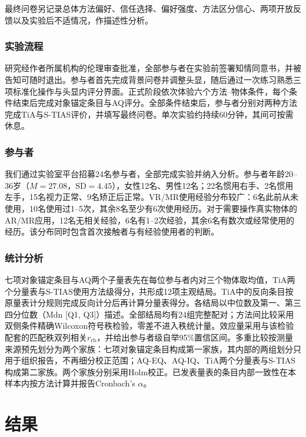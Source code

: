 \documentclass[review]{vgtc}
\begin{document}
最终问卷另记录总体方法偏好、信任选择、偏好强度、方法区分信心、两项开放反馈以及实验后不适情况，作描述性分析。

\subsubsection{实验流程}

研究经作者所属机构的伦理审查批准，全部参与者在实验前签署知情同意书，并被告知可随时退出。参与者首先完成背景问卷并调整头显，随后通过一次练习熟悉三项标准化操作与头显内评分界面。正式阶段依次体验六个方法--物体条件，每个条件结束后完成对象锚定条目与AQ评分。全部条件结束后，参与者分别对两种方法完成TiA与S-TIAS评价，并填写最终问卷。单次实验约持续60分钟，其间可按需休息。

\subsubsection{参与者}

我们通过实验室平台招募24名参与者，全部完成实验并纳入分析。参与者年龄20--36岁（$M=27.08$，$\mathrm{SD}=4.45$），女性12名、男性12名；22名惯用右手、2名惯用左手，15名视力正常、9名矫正后正常。VR/MR使用经验分布较广：6名此前从未使用，10名使用过1--5次，其余8名至少有6次使用经历。对于需要操作真实物体的AR/MR应用，12名无相关经验，6名有1--2次经验，其余6名有数次或经常使用的经历。该分布同时包含首次接触者与有经验使用者的判断。

\subsubsection{统计分析}

七项对象锚定条目与AQ两个子量表先在每位参与者内对三个物体取均值，TiA两个分量表与S-TIAS使用方法级得分，共形成12项主观结局。TiA中的反向条目按原量表计分规则完成反向计分后再计算分量表得分。各结局以中位数及第一、第三四分位数（Mdn [Q1, Q3]）描述。全部结局均有24组完整配对；方法间比较采用双侧条件精确Wilcoxon符号秩检验，零差不进入秩统计量。效应量采用与该检验配套的匹配秩双列相关$r_{\mathrm{rb}}$，并给出参与者级自举95\%置信区间。多重比较按测量来源预先划分为两个家族：七项对象锚定条目构成第一家族，其内部的两组划分只用于组织报告，不再细分校正范围；AQ-EQ、AQ-IQ、TiA两个分量表与S-TIAS构成第二家族。两个家族分别采用Holm校正。已发表量表的条目内部一致性在本样本内按方法计算并报告Cronbach's $\alpha$。

\section{结果}\label{sec:results}
\end{document}
